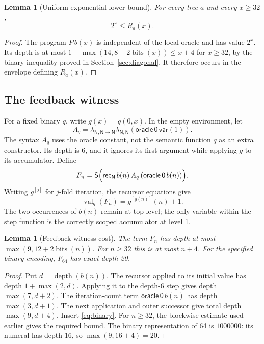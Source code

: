 \documentclass[11pt]{article}
\newtheorem{lemma}[theorem]{Lemma}
\theoremstyle{definition}
\newcommand{\tyN}{\mathsf N}
\newcommand{\val}{\operatorname{val}}
\newcommand{\depth}{\operatorname{depth}}
\newcommand{\bits}{\operatorname{bits}}
\newcommand{\Sc}{\mathsf S}
\newcommand{\Rc}{\mathsf{rec}}
\newcommand{\Oc}{\mathsf{oracle}}
\begin{document}
\begin{lemma}[Uniform exponential lower bound]\label{lem:exponential}
For every tree $a$ and every $x\ge32$,
\[
 2^x\le R_a(x).
\]
\end{lemma}
\begin{proof}
The program $P\,b(x)$ is independent of the local oracle and has value $2^x$.
Its depth is at most $1+\max(14,8+2\bits(x))\le x+4$ for $x\ge32$, by the
binary inequality proved in Section~\ref{sec:diagonal}. It therefore occurs
in the envelope defining $R_a(x)$.
\end{proof}

\subsection{The feedback witness}

For a fixed binary $q$, write $g(x)=q(0,x)$. In the empty environment, let
\[
 A_q=\lambda_{\tyN,\tyN\to\tyN}\lambda_{\tyN,\tyN}
      (\Oc\,\mathsf0\,\mathsf{var}(1)).
\]
The syntax $A_q$ uses the oracle constant, not the semantic function $q$ as
an extra constructor. Its depth is 6, and it ignores its first argument
while applying $g$ to its accumulator. Define
\begin{equation}\label{eq:feedbackwitness}
 F_n=\Sc\Bigl(
    \Rc_{\tyN}\,b(n)\,A_q\,
         (\Oc\,\mathsf0\,b(n))\Bigr).
\end{equation}
Writing $g^{[j]}$ for $j$-fold iteration, the recursor equations give
\begin{equation}\label{eq:feedbackvalue}
 \val_q(F_n)=g^{[g(n)]}(n)+1.
\end{equation}
The two occurrences of $b(n)$ remain at top level; the only variable within
the step function is the correctly scoped accumulator at level 1.

\begin{lemma}[Feedback witness cost]\label{lem:feedbackcost}
The term $F_n$ has depth at most
$\max(9,12+2\bits(n))$. For $n\ge32$ this is at most $n+4$.
For the specified binary encoding, $F_{64}$ has exact depth 20.
\end{lemma}
\begin{proof}
Put $d=\depth(b(n))$. The recursor applied to its initial value has depth
$1+\max(2,d)$. Applying it to the depth-6 step gives depth
$\max(7,d+2)$. The iteration-count term
$\Oc\,\mathsf0\,b(n)$ has depth $\max(3,d+1)$. The next application and
outer successor give total depth $\max(9,d+4)$. Insert
\eqref{eq:binary}. For $n\ge32$, the blockwise estimate used earlier gives
the required bound. The binary representation of 64 is $1000000$: its
numeral has depth 16, so $\max(9,16+4)=20$.
\end{proof}
\end{document}
